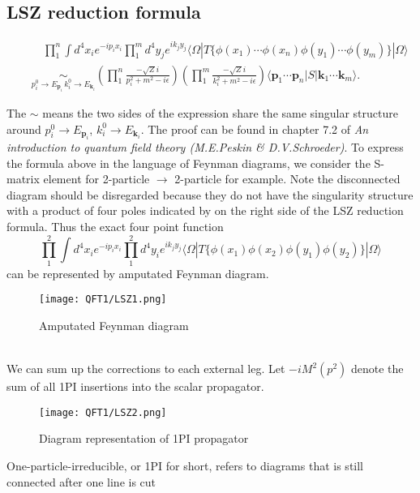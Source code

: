 \subsection{LSZ reduction formula}
\begin{newthem}
\begin{eqnarray}
&& \quad \prod_1^n \int d^4 x_i e^{-ip_ix_i} \prod_1^m d^4 y_j e^{ik_jy_j} \langle \Omega | T \{\phi(x_1) \cdots \phi(x_n) \phi(y_1) \cdots \phi(y_m)\} | \Omega \rangle \nonumber \\
&& \underset{ p_i^0 \to E_{\bm{p}_i}\, k_i^0 \to E_{\bm{k}_i}}{\sim}  \left( \prod_1^n \frac{-\sqrt{Z} i}{p_i^2 + m^2 -i\epsilon} \right) \left( \prod_1^m \frac{-\sqrt{Z} i}{k_i^2 + m^2 -i\epsilon} \right) \langle \bm{p}_1 \cdots \bm{p}_n | S | \bm{k}_1 \cdots \bm{k}_m \rangle .\nonumber
\end{eqnarray}
\end{newthem}
\noindent
The $\sim$ means the two sides of the expression share the same singular structure around $p_i^0 \to E_{\bm{p}_i}$, $k_i^0 \to E_{\bm{k}_i}$.
The proof can be found in chapter 7.2 of \emph{An introduction to quantum field theory (M.E.Peskin \& D.V.Schroeder)}.
To express the formula above in the language of Feynman diagrams, we consider the S-matrix element for 2-particle $\to$ 2-particle for example. Note the disconnected diagram should be disregarded because they do not have the singularity structure with a product of four poles indicated by on the right side of the LSZ reduction formula. Thus the exact four point function
\[\prod_1^2 \int d^4 x_i e^{-ip_ix_i} \prod_1^2 d^4 y_i e^{ik_jy_j} \langle \Omega | T \{\phi(x_1)\phi(x_2)\phi(y_1) \phi(y_2)\} | \Omega \rangle \]
can be represented by amputated Feynman diagram.
\begin{figure}[!h]
\centering
\texttt{[image: QFT1/LSZ1.png]}
\caption{Amputated Feynman diagram}
\end{figure}
\\
We can sum up the corrections to each external leg. Let $-iM^2(p^2)$ denote the sum of all 1PI insertions into the scalar propagator.
\begin{figure}[!h]
\centering
\texttt{[image: QFT1/LSZ2.png]}
\caption{Diagram representation of 1PI propagator}
\end{figure}
\begin{note}
One-particle-irreducible, or 1PI for short, refers to diagrams that is still connected after one line is cut
\end{note}
